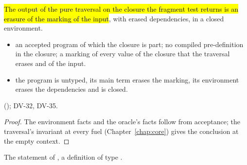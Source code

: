 \begin{theorem}
  \label{thm:EraseProof-erasePure_erases}
  \leanok
   \hl{The output of the pure traversal on the closure the fragment test returns is an erasure of the marking of the input}, with erased dependencies, in a closed environment.
  \begin{itemize}
  \item {} an accepted program of which the closure is part; no compiled pre-definition in the closure; a marking of every value of the closure that the traversal erases and of the input.
  \item {} the program is untyped, its main term erases the marking, its environment erases the dependencies and is closed.
  \end{itemize}
    (); DV-32, DV-35.
\end{theorem}
\begin{proof}
  \leanok
   The environment facts and the oracle's facts follow from acceptance; the traversal's invariant at every fuel (Chapter~\ref{chap:core}) gives the conclusion at the empty context.
\end{proof}

\begin{definition}
  \label{def:EraseProof-srcEval_sound-statement}
  \leanok
   The statement of , a definition of type .
\end{definition}

